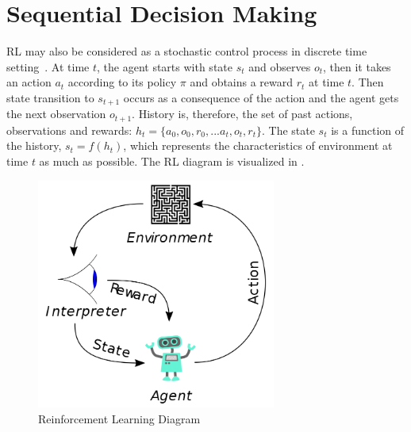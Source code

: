 \section{Sequential Decision Making}
\label{sec:decision_making}

RL may also be considered as a stochastic control process in discrete time setting~\cite{sutton_reinforcement_1998}. 
At time $t$, the agent starts with state $s_t$ and observes $o_t$, 
then it takes an action $a_t$ according to its policy $\pi$ and obtains a reward $r_t$ at time $t$. 
Then state transition to $s_{t+1}$ occurs as a consequence of the action and the agent gets the next observation $o_{t+1}$. 
History is, therefore, the set of past actions, observations and rewards: $h_t=\{ a_0, o_0, r_0, ... a_t, o_t, r_t\}$. 
The state $s_t$ is a function of the history, $s_t=f(h_t)$, 
which represents the characteristics of environment at time $t$ as much as possible. 
The RL diagram is visualized in . 
\begin{figure}
	\centering
	\includegraphics[width=0.7\textwidth]{figures/ml_theory/RL_diagram.png}
	\caption{Reinforcement Learning Diagram}
	\label{fig:rl_diagram}
\end{figure}